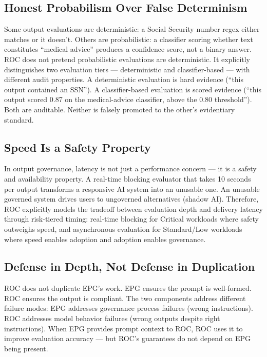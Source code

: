 \subsection{Honest Probabilism Over False Determinism}


Some output evaluations are deterministic: a Social Security number regex either matches or it doesn't. Others are probabilistic: a classifier scoring whether text constitutes ``medical advice'' produces a confidence score, not a binary answer. ROC does not pretend probabilistic evaluations are deterministic. It explicitly distinguishes two evaluation tiers --- deterministic and classifier-based --- with different audit properties. A deterministic evaluation is hard evidence (``this output contained an SSN''). A classifier-based evaluation is scored evidence (``this output scored 0.87 on the medical-advice classifier, above the 0.80 threshold''). Both are auditable. Neither is falsely promoted to the other's evidentiary standard.

\subsection{Speed Is a Safety Property}


In output governance, latency is not just a performance concern --- it is a safety and availability property. A real-time blocking evaluator that takes 10 seconds per output transforms a responsive AI system into an unusable one. An unusable governed system drives users to ungoverned alternatives (shadow AI). Therefore, ROC explicitly models the tradeoff between evaluation depth and delivery latency through risk-tiered timing: real-time blocking for Critical workloads where safety outweighs speed, and asynchronous evaluation for Standard/Low workloads where speed enables adoption and adoption enables governance.

\subsection{Defense in Depth, Not Defense in Duplication}


ROC does not duplicate EPG's work. EPG ensures the prompt is well-formed. ROC ensures the output is compliant. The two components address different failure modes: EPG addresses governance process failures (wrong instructions). ROC addresses model behavior failures (wrong outputs despite right instructions). When EPG provides prompt context to ROC, ROC uses it to improve evaluation accuracy --- but ROC's guarantees do not depend on EPG being present.



